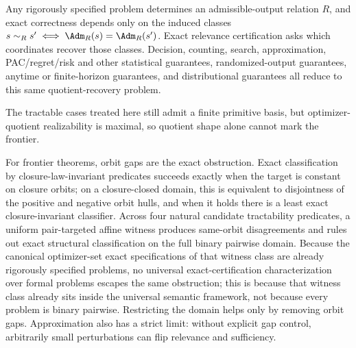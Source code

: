 Any rigorously specified problem determines an admissible-output relation $R$, and exact correctness depends only on the induced classes $s \sim_R s' \iff \Adm_R(s)=\Adm_R(s')$. Exact relevance certification asks which coordinates recover those classes. Decision, counting, search, approximation, PAC/regret/risk and other statistical guarantees, randomized-output guarantees, anytime or finite-horizon guarantees, and distributional guarantees all reduce to this same quotient-recovery problem.

The tractable cases treated here still admit a finite primitive basis, but optimizer-quotient realizability is maximal, so quotient shape alone cannot mark the frontier.

For frontier theorems, orbit gaps are the exact obstruction. Exact classification by closure-law-invariant predicates succeeds exactly when the target is constant on closure orbits; on a closure-closed domain, this is equivalent to disjointness of the positive and negative orbit hulls, and when it holds there is a least exact closure-invariant classifier. Across four natural candidate tractability predicates, a uniform pair-targeted affine witness produces same-orbit disagreements and rules out exact structural classification on the full binary pairwise domain. Because the canonical optimizer-set exact specifications of that witness class are already rigorously specified problems, no universal exact-certification characterization over formal problems escapes the same obstruction; this is because that witness class already sits inside the universal semantic framework, not because every problem is binary pairwise. Restricting the domain helps only by removing orbit gaps. Approximation also has a strict limit: without explicit gap control, arbitrarily small perturbations can flip relevance and sufficiency.
